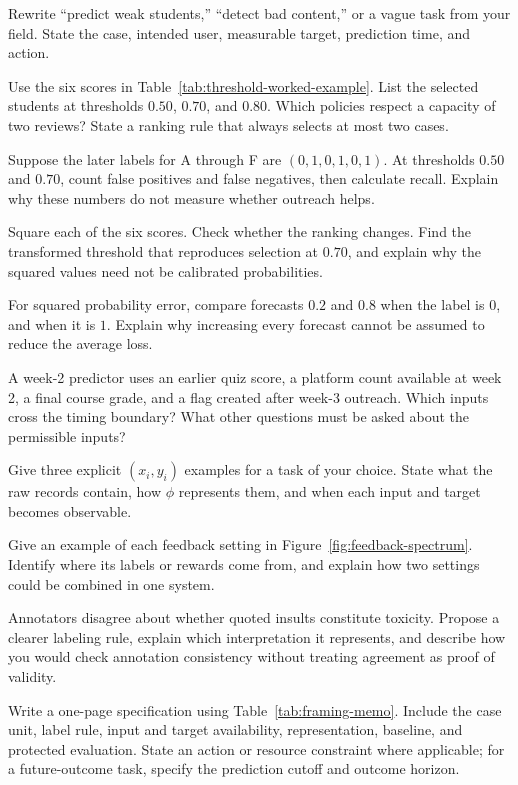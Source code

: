 \begin{exercises}
\item {}Rewrite ``predict weak students,'' ``detect bad content,'' or a vague task from your field. State the case, intended user, measurable target, prediction time, and action.
\item {}Use the six scores in Table~\ref{tab:threshold-worked-example}. List the selected students at thresholds $0.50$, $0.70$, and $0.80$. Which policies respect a capacity of two reviews? State a ranking rule that always selects at most two cases.
\item {}Suppose the later labels for A through F are $(0,1,0,1,0,1)$. At thresholds $0.50$ and $0.70$, count false positives and false negatives, then calculate recall. Explain why these numbers do not measure whether outreach helps.
\item {}Square each of the six scores. Check whether the ranking changes. Find the transformed threshold that reproduces selection at $0.70$, and explain why the squared values need not be calibrated probabilities.
\item {}For squared probability error, compare forecasts $0.2$ and $0.8$ when the label is $0$, and when it is $1$. Explain why increasing every forecast cannot be assumed to reduce the average loss.
\item {}A week-2 predictor uses an earlier quiz score, a platform count available at week 2, a final course grade, and a flag created after week-3 outreach. Which inputs cross the timing boundary? What other questions must be asked about the permissible inputs?
\item {}Give three explicit $(x_i,y_i)$ examples for a task of your choice. State what the raw records contain, how $\phi$ represents them, and when each input and target becomes observable.
\item {}Give an example of each feedback setting in Figure~\ref{fig:feedback-spectrum}. Identify where its labels or rewards come from, and explain how two settings could be combined in one system.
\item {}Annotators disagree about whether quoted insults constitute toxicity. Propose a clearer labeling rule, explain which interpretation it represents, and describe how you would check annotation consistency without treating agreement as proof of validity.
\begin{samepage}
\item {}Write a one-page specification using Table~\ref{tab:framing-memo}. Include the case unit, label rule, input and target availability, representation, baseline, and protected evaluation. State an action or resource constraint where applicable; for a future-outcome task, specify the prediction cutoff and outcome horizon.
\end{samepage}
\end{exercises}

